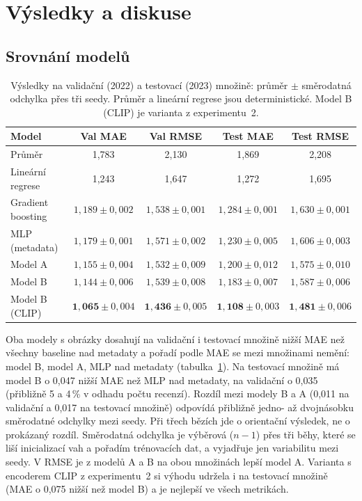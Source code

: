 \section{Výsledky a diskuse}

\subsection*{Srovnání modelů}

\begin{table}[h]
    \centering
    \begin{tabular}{lcccc}
        \toprule
        Model & Val MAE & Val RMSE & Test MAE & Test RMSE \\
        \midrule
        Průměr & 1,783 & 2,130 & 1,869 & 2,208 \\
        Lineární regrese & 1,243 & 1,647 & 1,272 & 1,695 \\
        Gradient boosting & $1{,}189 \pm 0{,}002$ & $1{,}538 \pm 0{,}001$ & $1{,}284 \pm 0{,}001$ & $1{,}630 \pm 0{,}001$ \\
        MLP (metadata) & $1{,}179 \pm 0{,}001$ & $1{,}571 \pm 0{,}002$ & $1{,}230 \pm 0{,}005$ & $1{,}606 \pm 0{,}003$ \\
        Model A & $1{,}155 \pm 0{,}004$ & $1{,}532 \pm 0{,}009$ & $1{,}200 \pm 0{,}012$ & $1{,}575 \pm 0{,}010$ \\
        Model B & $1{,}144 \pm 0{,}006$ & $1{,}539 \pm 0{,}008$ & $1{,}183 \pm 0{,}007$ & $1{,}587 \pm 0{,}006$ \\
        Model B (CLIP) & $\mathbf{1{,}065} \pm 0{,}004$ & $\mathbf{1{,}436} \pm 0{,}005$ & $\mathbf{1{,}108} \pm 0{,}003$ & $\mathbf{1{,}481} \pm 0{,}006$ \\
        \bottomrule
    \end{tabular}
    \caption{Výsledky na validační (2022) a testovací (2023) množině: průměr $\pm$ směrodatná
    odchylka přes tři seedy. Průměr a lineární regrese jsou deterministické. Model B (CLIP)
    je varianta z experimentu~2.}
    \label{tab:vysledky}
\end{table}

Oba modely s obrázky dosahují na validační i testovací množině nižší MAE než všechny baseline
nad metadaty a pořadí podle MAE se mezi množinami nemění: model B, model A, MLP nad metadaty
(tabulka~\ref{tab:vysledky}). Na testovací množině má model B o 0,047 nižší MAE než MLP nad
metadaty, na validační o 0,035 (přibližně 5 a 4\,\% v odhadu počtu recenzí). Rozdíl mezi modely B a A (0,011 na validační a 0,017
na testovací množině) odpovídá přibližně jedno- až dvojnásobku směrodatné odchylky mezi seedy.
Při třech bězích jde o orientační výsledek, ne o prokázaný rozdíl.
Směrodatná odchylka je výběrová ($n - 1$) přes tři běhy, které se liší inicializací vah
a pořadím trénovacích dat, a vyjadřuje jen variabilitu mezi seedy. V RMSE je z modelů A a B
na obou množinách lepší model A. Varianta s encoderem CLIP z experimentu~2 si výhodu udržela
i na testovací množině (MAE o 0,075 nižší než model B) a je nejlepší ve všech metrikách.

